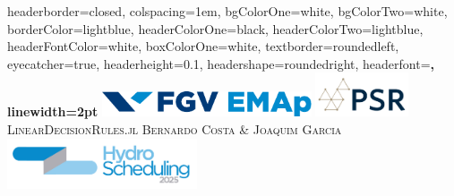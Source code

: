 \documentclass[a0paper,fontscale=0.285]{baposter} %
\begin{document}
\begin{poster}
{
headerborder=closed, %
colspacing=1em, %
bgColorOne=white, %
bgColorTwo=white, %
borderColor=lightblue, %
headerColorOne=black, %
headerColorTwo=lightblue, %
headerFontColor=white, %
boxColorOne=white, %
textborder=roundedleft, %
eyecatcher=true, %
headerheight=0.1\textheight, %
headershape=roundedright, %
headerfont=\Large\bf\textsc, %
linewidth=2pt %
}
%
{\vbox{%
  \hbox{\includegraphics[height=2em]{emap_logo.pdf}}
  \hbox{\includegraphics[height=3.5em]{logo_psr.pdf}}%
  }} %
{\textsc{LinearDecisionRules.jl}\vspace{0.5em}} %
{\textsc{Bernardo Costa \& Joaquim Garcia}} %
{\includegraphics[height=4em]{logo_hpsc.png}} %


\end{poster}
\end{document}
